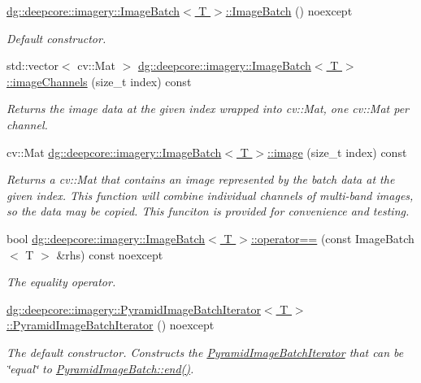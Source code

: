 \begin{DoxyCompactItemize}
\hyperlink{group___imagery_module_ga52149325af21fd8be3bde4c7d78696cd}{dg\+::deepcore\+::imagery\+::\+Image\+Batch$<$ T $>$\+::\+Image\+Batch} () noexcept
\begin{DoxyCompactList}\small\item\em Default constructor. \end{DoxyCompactList}\item 
std\+::vector$<$ cv\+::\+Mat $>$ \hyperlink{group___imagery_module_ga7ccd99a9f9c630c7b732712635684f1f}{dg\+::deepcore\+::imagery\+::\+Image\+Batch$<$ T $>$\+::image\+Channels} (size\+\_\+t index) const 
\begin{DoxyCompactList}\small\item\em Returns the image data at the given index wrapped into cv\+::\+Mat, one cv\+::\+Mat per channel. \end{DoxyCompactList}\item 
cv\+::\+Mat \hyperlink{group___imagery_module_ga73b4b21231657bbb95ab18e4be9f4e19}{dg\+::deepcore\+::imagery\+::\+Image\+Batch$<$ T $>$\+::image} (size\+\_\+t index) const 
\begin{DoxyCompactList}\small\item\em Returns a cv\+::\+Mat that contains an image represented by the batch data at the given index. This function will combine individual channels of multi-\/band images, so the data may be copied. This funciton is provided for convenience and testing. \end{DoxyCompactList}\item 
bool \hyperlink{group___imagery_module_ga6663c2526c7d20915f501b0ac54117be}{dg\+::deepcore\+::imagery\+::\+Image\+Batch$<$ T $>$\+::operator==} (const Image\+Batch$<$ T $>$ \&rhs) const noexcept
\begin{DoxyCompactList}\small\item\em The equality operator. \end{DoxyCompactList}\item 
\hyperlink{group___imagery_module_ga9859e48a78c1a93cbc5d6ec39bfa33c4}{dg\+::deepcore\+::imagery\+::\+Pyramid\+Image\+Batch\+Iterator$<$ T $>$\+::\+Pyramid\+Image\+Batch\+Iterator} () noexcept
\begin{DoxyCompactList}\small\item\em The default constructor. Constructs the \hyperlink{classdg_1_1deepcore_1_1imagery_1_1_pyramid_image_batch_iterator}{Pyramid\+Image\+Batch\+Iterator} that can be \char`\"{}equal\char`\"{} to \hyperlink{group___imagery_module_ga7e2fa7f2608bc1784f52c8f165fcc2f7}{Pyramid\+Image\+Batch\+::end()}. \end{DoxyCompactList}\item 

\end{DoxyCompactItemize}
